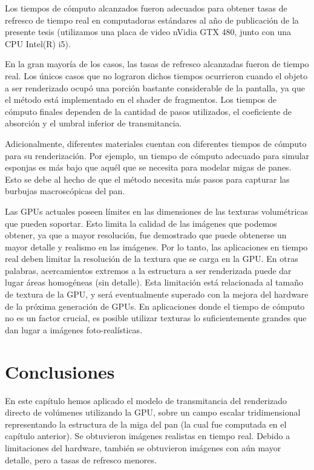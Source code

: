 
Los tiempos de cómputo alcanzados fueron adecuados para obtener tasas de refresco de tiempo real en computadoras estándares al año de publicación de la presente tesis (utilizamos una placa de video nVidia GTX 480, junto con una \acrshort{CPU} Intel(R) i5).

En la gran mayoría de los casos, las tasas de refresco alcanzadas fueron de tiempo real.
Los únicos casos que no lograron dichos tiempos ocurrieron cuando el objeto a ser renderizado ocupó una porción bastante considerable de la pantalla, ya que el método está implementado en el shader de fragmentos.
Los tiempos de cómputo finales dependen de la cantidad de pasos utilizados, el coeficiente de absorción y el umbral inferior de transmitancia.

Adicionalmente, diferentes materiales cuentan con diferentes tiempos de cómputo para su renderización.
Por ejemplo, un tiempo de cómputo adecuado para simular esponjas es más bajo que aquél que se necesita para modelar migas de panes.
Esto se debe al hecho de que el método necesita más pasos para capturar las burbujas macroscópicas del pan.

Las GPUs actuales poseen límites en las dimensiones de las texturas volumétricas que pueden soportar.
Esto limita la calidad de las imágenes que podemos obtener, ya que a mayor resolución, fue demostrado que puede obtenerse un mayor detalle y realismo en las imágenes.
Por lo tanto, las aplicaciones en tiempo real deben limitar la resolución de la textura que se carga en la GPU.
En otras palabras, acercamientos extremos a la estructura a ser renderizada puede dar lugar áreas homogéneas (sin detalle).
Esta limitación está relacionada al tamaño de textura de la GPU, y será eventualmente superado con la mejora del hardware de la próxima generación de GPUs.
En aplicaciones donde el tiempo de cómputo no es un factor crucial, es posible utilizar texturas lo suficientemente grandes que dan lugar a imágenes foto-realísticas.

\section{Conclusiones}

En este capítulo hemos aplicado el modelo de transmitancia del renderizado directo de volúmenes utilizando la GPU, sobre un campo escalar tridimensional representando la estructura de la miga del pan (la cual fue computada en el capítulo anterior).
Se obtuvieron imágenes realistas en tiempo real.
Debido a limitaciones del hardware, también se obtuvieron imágenes con aún mayor detalle, pero a tasas de refresco menores.

